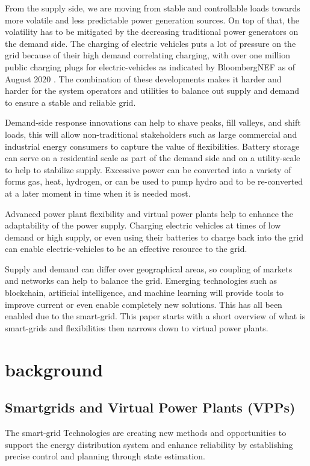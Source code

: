 \documentclass[nonacm,sigconf,12pt]{acmart}
\begin{document}
From the supply side, we are moving from stable and controllable loads towards more volatile and less predictable power generation sources. On top of that, the volatility has to be mitigated by the decreasing traditional power generators on the demand side. The charging of electric vehicles puts a lot of pressure on the grid because of their high demand correlating charging, with over one million public charging plugs for electric-vehicles as indicated by BloombergNEF as of August 2020 \cite{stock_2020_global}. The combination of these developments makes it harder and harder for the system operators and utilities to balance out supply and demand to ensure a stable and reliable grid. 

Demand-side response innovations can help to shave peaks, fill valleys, and shift loads, \cite{arteconi_2018_assessing} this will allow non-traditional stakeholders such as large commercial and industrial energy consumers to capture the value of flexibilities. Battery storage can serve on a residential scale as part of the demand side and on a utility-scale to help to stabilize supply. Excessive power can be converted into a variety of forms gas, heat, hydrogen, or can be used to pump hydro and to be re-converted at a later moment in time when it is needed most.

Advanced power plant flexibility and virtual power plants help to enhance the adaptability of the power supply. Charging electric vehicles at times of low demand or high supply, or even using their batteries to charge back into the grid can enable electric-vehicles to be an effective resource to the grid. 

Supply and demand can differ over geographical areas, so coupling of markets and networks can help to balance the grid. Emerging technologies such as blockchain, artificial intelligence, and machine learning will provide tools to improve current or even enable completely new solutions. This has all been enabled due to the smart-grid. This paper starts with a short overview of what is smart-grids and flexibilities then narrows down to virtual power plants.

\section*{background}
\subsection*{Smartgrids and Virtual Power Plants (VPPs)}
The smart-grid Technologies are creating new methods and opportunities to support the energy distribution system and enhance reliability by establishing precise control and planning through state estimation.\cite{huang_2012_state} 
\end{document}
